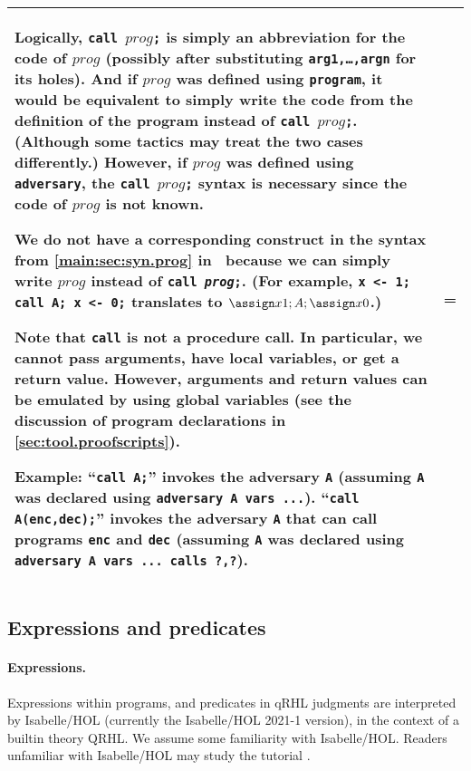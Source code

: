 \documentclass{article}
\newcommand\qrhlautoref[1]{\autoref*{main:#1} in~\cite{qrhl-paper-from-manual}}
\begin{document}
\begin{longtable}{|p{.275\hsize}|>{\parskip=\medskipamount}p{.66\hsize}|}
  Logically, \texttt{call $\mathit{prog}$;}
  is simply an abbreviation for the code of $\mathit{prog}$
  (possibly after substituting \texttt{arg1,\dots,argn} for its holes).
  And if $\mathit{prog}$
  was defined using \texttt{program}, it would be equivalent to simply
  write the code from the definition of the program instead of
  \texttt{call $\mathit{prog}$;}.
  (Although some tactics may treat the two cases differently.)
  However, if $\mathit{prog}$
  was defined using \texttt{adversary}, the \texttt{call
    $\mathit{prog}$;}
  syntax is necessary since the code of $\mathit{prog}$ is not known.

  We do not have a corresponding construct in the syntax from
  \qrhlautoref{sec:syn.prog} because we can simply write $\mathit{prog}$
  instead of \texttt{call \textit{prog};}. (For example, \texttt{x <-
    1; call A; x <- 0;} translates to $\assign x1;A;\assign x0$.)

  Note that \texttt{call} is not a procedure call. In particular, we
  cannot pass arguments, have local variables, or get a return
  value. However, arguments and return values can be emulated
  by using global variables (see the discussion of program
  declarations in \autoref{sec:tool.proofscripts}).

  \textbf{Example:} ``\texttt{call A;}'' invokes the adversary \texttt{A}
  (assuming \texttt{A} was declared using \texttt{adversary A vars
    ...}).  ``\texttt{call A(enc,dec);}'' invokes the adversary \texttt{A}
  that can call programs \texttt{enc} and \texttt{dec}
  (assuming \texttt{A} was declared using \texttt{adversary A vars
    ... calls ?,?}).
  \\
  \hline
\end{longtable}

\subsection{Expressions and predicates}
\label{sec:tool.pred}

\newcommand\tooltype[1]{\index{#1@\textttOLD{#1} (Isabelle/HOL type)}}

\paragraph{Expressions.}
Expressions within programs, and predicates in qRHL judgments are
interpreted by Isabelle/HOL (currently the Isabelle/HOL 2021-1 version), in the
context of a builtin theory QRHL. We assume some familiarity with
Isabelle/HOL. Readers unfamiliar with Isabelle/HOL may study the
tutorial \cite{isabelle-tutorial}.
\end{document}
